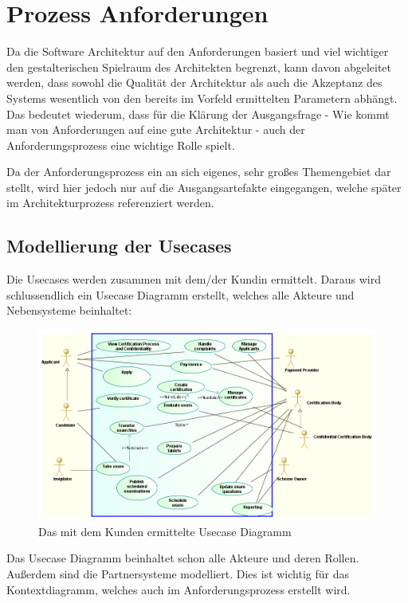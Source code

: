\chapter{Prozess Anforderungen}
Da die Software Architektur auf den Anforderungen basiert und viel wichtiger \glqq den gestalterischen Spielraum des Architekten\grqq \cite[S. 103]{softarch} begrenzt, kann davon abgeleitet werden, dass sowohl die Qualität der Architektur als auch die Akzeptanz des Systems wesentlich von den bereits im Vorfeld ermittelten Parametern abhängt. Das bedeutet wiederum, dass für die Klärung der Ausgangsfrage - Wie kommt man von Anforderungen auf eine gute Architektur - auch der Anforderungsprozess eine wichtige Rolle spielt.

Da der Anforderungsprozess ein an sich eigenes, sehr großes Themengebiet dar stellt, wird hier jedoch nur auf die Ausgangsartefakte eingegangen, welche später im Architekturprozess referenziert werden.

\section{Modellierung der Usecases}
Die Usecases werden zusammen mit dem/der Kundin ermittelt. Daraus wird schlussendlich ein Usecase Diagramm erstellt, welches alle Akteure und Nebensysteme beinhaltet:

\begin{figure}[!htbp]
    \centering
    \includegraphics[scale=0.5]{uml/usecase.png}
    \caption{Das mit dem Kunden ermittelte Usecase Diagramm}
\end{figure}

Das Usecase Diagramm beinhaltet schon alle Akteure und deren Rollen. Außerdem sind die Partnersysteme modelliert. Dies ist wichtig für das Kontextdiagramm, welches auch im Anforderungsprozess erstellt wird.

